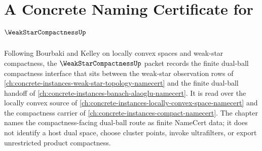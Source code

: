 \chapter{A Concrete Naming Certificate for $\WeakStarCompactnessUp$}
\label{ch:concrete-instances-weak-star-compactness-namecert}

Following Bourbaki and Kelley on locally convex spaces and weak-star compactness, the $\WeakStarCompactnessUp$ packet records the finite dual-ball compactness interface that sits between the weak-star observation rows of \autoref{ch:concrete-instances-weak-star-topology-namecert} and the finite dual-ball handoff of \autoref{ch:concrete-instances-banach-alaoglu-namecert}. It is read over the locally convex source of \autoref{ch:concrete-instances-locally-convex-space-namecert} and the compactness carrier of \autoref{ch:concrete-instances-compact-namecert}. The chapter names the compactness-facing dual-ball route as finite NameCert data; it does not identify a host dual space, choose cluster points, invoke ultrafilters, or export unrestricted product compactness.

